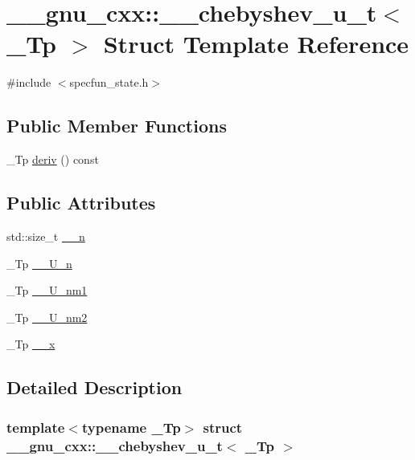 \hypertarget{struct____gnu__cxx_1_1____chebyshev__u__t}{}\section{\+\_\+\+\_\+gnu\+\_\+cxx\+:\+:\+\_\+\+\_\+chebyshev\+\_\+u\+\_\+t$<$ \+\_\+\+Tp $>$ Struct Template Reference}
\label{struct____gnu__cxx_1_1____chebyshev__u__t}


{\ttfamily \#include $<$specfun\+\_\+state.\+h$>$}

\subsection*{Public Member Functions}
\begin{DoxyCompactItemize}
\item 
\+\_\+\+Tp \hyperlink{struct____gnu__cxx_1_1____chebyshev__u__t_ad850788d0ce4eb967c52692f599073cd}{deriv} () const
\end{DoxyCompactItemize}
\subsection*{Public Attributes}
\begin{DoxyCompactItemize}
\item 
std\+::size\+\_\+t \hyperlink{struct____gnu__cxx_1_1____chebyshev__u__t_af53b3900d2fe12c86d6d436feda54d4e}{\+\_\+\+\_\+n}
\item 
\+\_\+\+Tp \hyperlink{struct____gnu__cxx_1_1____chebyshev__u__t_a515faf25d4a4d05274fabd742db18eac}{\+\_\+\+\_\+\+U\+\_\+n}
\item 
\+\_\+\+Tp \hyperlink{struct____gnu__cxx_1_1____chebyshev__u__t_a0e3eb1db01a23349452f9909b13d61a2}{\+\_\+\+\_\+\+U\+\_\+nm1}
\item 
\+\_\+\+Tp \hyperlink{struct____gnu__cxx_1_1____chebyshev__u__t_aaf3bcdc6d46aaa2c173e0b07a1e36827}{\+\_\+\+\_\+\+U\+\_\+nm2}
\item 
\+\_\+\+Tp \hyperlink{struct____gnu__cxx_1_1____chebyshev__u__t_a038c998d409d5fb0404df67afb9b217c}{\+\_\+\+\_\+x}
\end{DoxyCompactItemize}


\subsection{Detailed Description}
\subsubsection*{template$<$typename \+\_\+\+Tp$>$\newline
struct \+\_\+\+\_\+gnu\+\_\+cxx\+::\+\_\+\+\_\+chebyshev\+\_\+u\+\_\+t$<$ \+\_\+\+Tp $>$}

